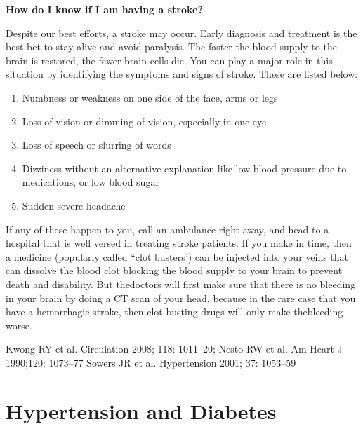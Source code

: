 \vskip 4pt
\noindent\textbf{How do I know if I am having a stroke?}
\vskip 4pt

Despite our best efforts, a stroke may occur. Early diagnosis and treatment is the best bet to stay alive and avoid paralysis. The faster the blood supply to the brain is restored, the fewer brain cells die. You can play a major role in this situation by identifying the symptoms and signs of stroke. These are listed below:

\vspace{-\topsep}
\begin{enumerate}[•]
\itemsep=0pt
\item Numbness or weakness on one side of the face, arms or legs
\item Loss of vision or dimming of vision, especially in one eye
\item Loss of speech or slurring of words
\item Dizziness without an alternative explanation like low blood pressure due to medications, or low blood sugar
\item Sudden severe headache
\end{enumerate}
\vspace{-\topsep}

If any of these happen to you, call an ambulance right away, and head to a hospital that is well versed in treating stroke patients. If you make in time, then a medicine (popularly called “clot busters’) can be injected into your veins that can dissolve the blood clot blocking the blood supply to your brain to prevent death and disability. But the\break doctors will first make sure that there is no bleeding in your brain by doing a CT scan of your head, because in the rare case that you have a hemorrhagic stroke, then clot busting drugs will only make the\break bleeding worse.

\clearpage

\begin{thebibliography}{99}
 Kwong RY et al. Circulation 2008; 118: 1011–20; Nesto RW et al. Am Heart J 1990;120: 1073–77
 Sowers JR et al. Hypertension 2001; 37: 1053–59
\end{thebibliography}


\newpage
 
\renewcommand{\thechapter}{\arabic{chapter}A}
\chapter{Hypertension and Diabetes}\label{chap13A}

